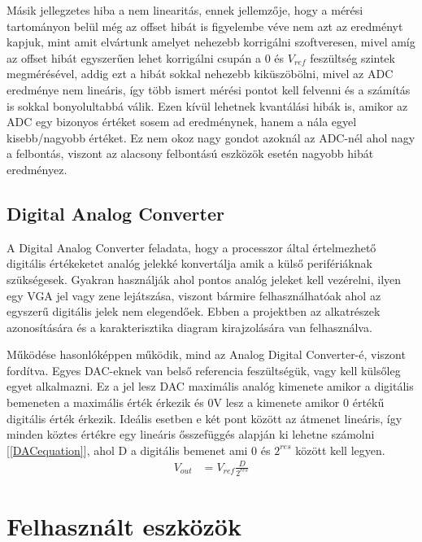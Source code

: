 Másik jellegzetes hiba a nem linearitás, ennek jellemzője, hogy a mérési 
tartományon belül még az offset hibát is figyelembe véve nem azt az eredményt 
kapjuk, mint amit elvártunk amelyet nehezebb korrigálni szoftveresen, mivel amíg 
az offset hibát egyszerűen lehet korrigálni csupán a 0 és $V_{ref}$ feszültség szintek 
megmérésével, addig ezt a hibát sokkal nehezebb kiküszöbölni, mivel az ADC 
eredménye nem lineáris, így több ismert mérési pontot kell felvenni és a számítás 
is sokkal bonyolultabbá válik. Ezen kívül lehetnek kvantálási hibák is, amikor az 
ADC egy bizonyos értéket sosem ad eredménynek, hanem a nála egyel kisebb/nagyobb 
értéket. Ez nem okoz nagy gondot azoknál az ADC-nél ahol nagy a felbontás, viszont 
az alacsony felbontású eszközök esetén nagyobb hibát eredményez.

\subsection{Digital Analog Converter}

A Digital Analog Converter feladata, hogy a processzor által értelmezhető digitális
értékeketet analóg jelekké konvertálja amik a külső perifériáknak szükségesek.
Gyakran használják ahol pontos analóg jeleket kell vezérelni, ilyen egy VGA jel
vagy zene lejátszása, viszont bármire felhasználhatóak ahol az egyszerű digitális
jelek nem elegendőek. Ebben a projektben az alkatrészek azonosítására és a 
karakterisztika diagram kirajzolására van felhasználva.

Működése hasonlóképpen működik, mind az Analog Digital Converter-é, viszont fordítva.
Egyes DAC-eknek van belső referencia feszültségük, vagy kell külsőleg egyet alkalmazni.
Ez a jel lesz DAC maximális analóg kimenete amikor a digitális bemeneten a maximális
érték érkezik és 0V lesz a kimenete amikor 0 értékű digitális érték érkezik. Ideális
esetben e két pont között az átmenet lineáris, így minden köztes értékre egy lineáris
ősszefüggés alapján ki lehetne számolni [\ref{DACequation}], ahol D a digitális bemenet
ami 0 és $2^{res}$ között kell legyen.
\begin{equation}
    \label{DACequation}
    \begin{split}
        V_{out} &= V_{ref} \frac{D}{2^{res}}
    \end{split}
    \end{equation}

\section{Felhasznált eszközök}


